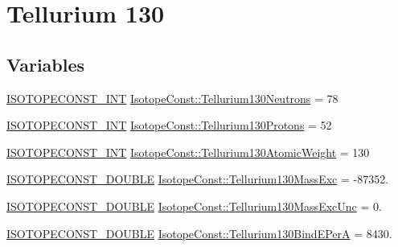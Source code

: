 \hypertarget{group___isotope_const-_tellurium-_te130}{}\section{Tellurium 130}
\label{group___isotope_const-_tellurium-_te130}
\subsection*{Variables}
\begin{DoxyCompactItemize}
\item 
\mbox{\hyperlink{group___isotope_const-_macros_ga5f18360b3e99483a35c32d789e62621c}{I\+S\+O\+T\+O\+P\+E\+C\+O\+N\+S\+T\+\_\+\+I\+NT}} \mbox{\hyperlink{group___isotope_const-_tellurium-_te130_gab2edd6cb02b28416fa9fec77eccb2f7a}{Isotope\+Const\+::\+Tellurium130\+Neutrons}} = 78
\item 
\mbox{\hyperlink{group___isotope_const-_macros_ga5f18360b3e99483a35c32d789e62621c}{I\+S\+O\+T\+O\+P\+E\+C\+O\+N\+S\+T\+\_\+\+I\+NT}} \mbox{\hyperlink{group___isotope_const-_tellurium-_te130_gaa7b689f78bd6a660843f77e2f83fa515}{Isotope\+Const\+::\+Tellurium130\+Protons}} = 52
\item 
\mbox{\hyperlink{group___isotope_const-_macros_ga5f18360b3e99483a35c32d789e62621c}{I\+S\+O\+T\+O\+P\+E\+C\+O\+N\+S\+T\+\_\+\+I\+NT}} \mbox{\hyperlink{group___isotope_const-_tellurium-_te130_ga4d574b9259f14a6344fe8b89da03e4e5}{Isotope\+Const\+::\+Tellurium130\+Atomic\+Weight}} = 130
\item 
\mbox{\hyperlink{group___isotope_const-_macros_ga8f45a7272ce02c0b4c65c44636ed719a}{I\+S\+O\+T\+O\+P\+E\+C\+O\+N\+S\+T\+\_\+\+D\+O\+U\+B\+LE}} \mbox{\hyperlink{group___isotope_const-_tellurium-_te130_ga60abc6c0d41865a44953b5a662a0e4c5}{Isotope\+Const\+::\+Tellurium130\+Mass\+Exc}} = -\/87352.
\item 
\mbox{\hyperlink{group___isotope_const-_macros_ga8f45a7272ce02c0b4c65c44636ed719a}{I\+S\+O\+T\+O\+P\+E\+C\+O\+N\+S\+T\+\_\+\+D\+O\+U\+B\+LE}} \mbox{\hyperlink{group___isotope_const-_tellurium-_te130_gabf9d56d669ec51724e0193784be00d82}{Isotope\+Const\+::\+Tellurium130\+Mass\+Exc\+Unc}} = 0.
\item 
\mbox{\hyperlink{group___isotope_const-_macros_ga8f45a7272ce02c0b4c65c44636ed719a}{I\+S\+O\+T\+O\+P\+E\+C\+O\+N\+S\+T\+\_\+\+D\+O\+U\+B\+LE}} \mbox{\hyperlink{group___isotope_const-_tellurium-_te130_gad85723d4cb8f5eeb67c2f4cd93e872ab}{Isotope\+Const\+::\+Tellurium130\+Bind\+E\+PerA}} = 8430.
\item 

\end{DoxyCompactItemize}
